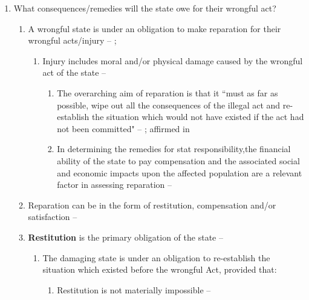 \begin{enumerate}
    \item What consequences/remedies will the state owe for their wrongful act?
    \begin{enumerate}
        \item A wrongful state is under an obligation to make reparation for their wrongful acts/injury -- ; 
        \begin{enumerate}
            \item Injury includes moral and/or physical damage caused by the wrongful act of the state -- 
            \begin{enumerate}
                \item The overarching aim of reparation is that it ``must as far as possible, wipe out all the consequences of the illegal act and re-establish the situation which would not have existed if the act had not been committed" -- ; affirmed in 
                \item In determining the remedies for stat responsibility,the financial ability of the state to pay compensation and the associated social and economic impacts upon the affected population are a relevant factor in assessing reparation -- 
            \end{enumerate}
        \end{enumerate}
        \item Reparation can be in the form of restitution, compensation and/or satisfaction -- 
        \item \textbf{Restitution} is the primary obligation of the state -- 
        \begin{enumerate}
            \item The damaging state is under an obligation to re-establish the situation which existed before the wrongful Act, provided that:
            \begin{enumerate}
                \item Restitution is not materially impossible -- 

\end{enumerate}
\end{enumerate}
\end{enumerate}
\end{enumerate}
